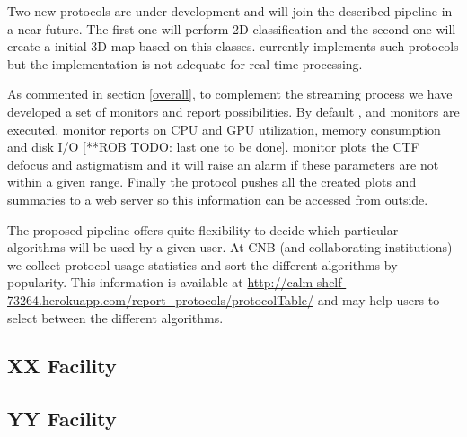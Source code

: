 Two new protocols are under development and will join the described  pipeline in a near future. The first one will perform 2D classification and the second one will create a initial 3D map based on this classes. \scipion currently implements such protocols but the implementation is not adequate for real time processing.

As commented in section \ref{overall}, to complement the streaming process we have developed a set of monitors and report possibilities. By default ,  and  monitors are executed.  monitor reports on  CPU and GPU utilization, memory consumption and disk I/O [**ROB TODO: last one to be done].  monitor plots the CTF defocus and astigmatism  and it will raise an alarm if these parameters are not within a given range. Finally the  protocol pushes all the created plots and summaries to a web server 
so this information can be accessed from outside.

The proposed pipeline offers quite flexibility to decide which particular algorithms will be used by a given user. At CNB (and collaborating institutions) we collect protocol usage statistics and sort the different algorithms by popularity.  This information is available at  \url{http://calm-shelf-73264.herokuapp.com/report_protocols/protocolTable/} and may help users to select   between the different algorithms.

\subsection{XX Facility}

\subsection{YY Facility}





